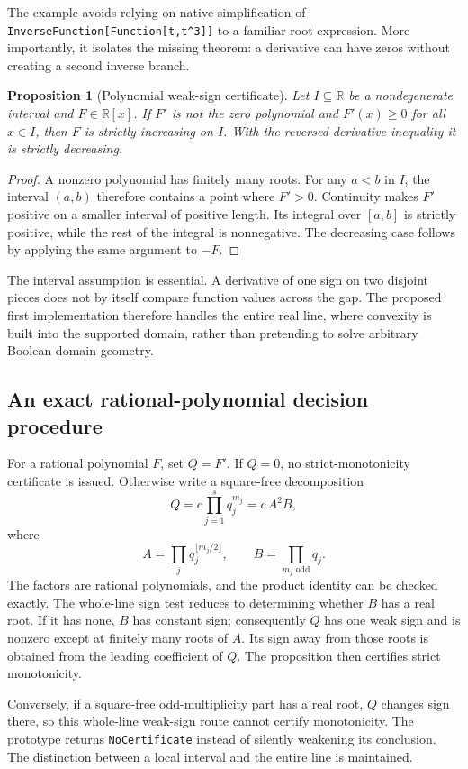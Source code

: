 \documentclass[11pt,letterpaper]{article}
\newcommand{\code}[1]{\nolinkurl{#1}}
\newcommand{\R}{\mathbb R}
\newtheorem{proposition}{Proposition}[section]
\begin{document}
The example avoids relying on native simplification of \code{InverseFunction[Function[t,t^3]]} to a familiar root expression. More importantly, it isolates the missing theorem: a derivative can have zeros without creating a second inverse branch.

\begin{proposition}[Polynomial weak-sign certificate]
Let \(I\subseteq\R\) be a nondegenerate interval and \(F\in\R[x]\). If \(F'\) is not the zero polynomial and \(F'(x)\ge0\) for all \(x\in I\), then \(F\) is strictly increasing on \(I\). With the reversed derivative inequality it is strictly decreasing.
\end{proposition}
\begin{proof}
A nonzero polynomial has finitely many roots. For any \(a<b\) in \(I\), the interval \((a,b)\) therefore contains a point where \(F'>0\). Continuity makes \(F'\) positive on a smaller interval of positive length. Its integral over \([a,b]\) is strictly positive, while the rest of the integral is nonnegative. The decreasing case follows by applying the same argument to \(-F\).
\end{proof}

The interval assumption is essential. A derivative of one sign on two disjoint pieces does not by itself compare function values across the gap. The proposed first implementation therefore handles the entire real line, where convexity is built into the supported domain, rather than pretending to solve arbitrary Boolean domain geometry.

\subsection{An exact rational-polynomial decision procedure}
For a rational polynomial \(F\), set \(Q=F'\). If \(Q=0\), no strict-monotonicity certificate is issued. Otherwise write a square-free decomposition
\[
 Q=c\prod_{j=1}^{s}q_j^{m_j}
   =c\,A^2B,
\]
where
\[
 A=\prod_jq_j^{\lfloor m_j/2\rfloor},\qquad
 B=\prod_{m_j\text{ odd}}q_j.
\]
The factors are rational polynomials, and the product identity can be checked exactly. The whole-line sign test reduces to determining whether \(B\) has a real root. If it has none, \(B\) has constant sign; consequently \(Q\) has one weak sign and is nonzero except at finitely many roots of \(A\). Its sign away from those roots is obtained from the leading coefficient of \(Q\). The proposition then certifies strict monotonicity.

Conversely, if a square-free odd-multiplicity part has a real root, \(Q\) changes sign there, so this whole-line weak-sign route cannot certify monotonicity. The prototype returns \code{NoCertificate} instead of silently weakening its conclusion. The distinction between a local interval and the entire line is maintained.
\end{document}
